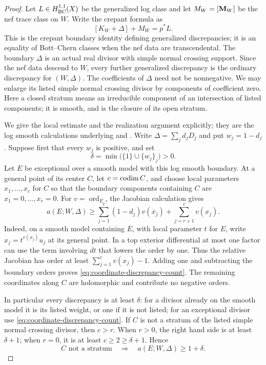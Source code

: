 \begin{proof}
Let $L\in H^{1,1}_{\mathrm{BC}}(X)$ be the generalized log class and let
$M_W=[\mathbf M_W]$ be the nef trace class on $W$.  Write the crepant formula as
\begin{equation}\label{eq:carrier-boundary-count}
 [K_W+\Delta]+M_W=p^*L.
\end{equation}
This is the crepant boundary identity defining generalized
discrepancies; it is an equality of Bott--Chern classes when the nef
data are transcendental.  The boundary $\Delta$ is an actual real
divisor with simple normal crossing support.  Since the nef data
descend to $W$, every further generalized discrepancy is the ordinary
discrepancy for $(W,\Delta)$.  The coefficients of $\Delta$ need not be
nonnegative.  We may enlarge its listed simple normal crossing divisor
by components of coefficient zero.
Here a closed stratum means an irreducible component of an intersection
of listed components; it is smooth, and is the closure of its open
stratum.

We give the local estimate and the realization argument explicitly;
they are the log smooth calculations underlying
\cite[Proposition~2.36]{KM1998} and
\cite[Proposition~2.8]{CT2023}.
Write $\Delta=\sum_j d_jD_j$ and put $w_j=1-d_j$.
Suppose first that every $w_j$ is positive, and set
\[
 \delta=\min\bigl(\{1\}\cup\{w_j\}_j\bigr)>0.
\]
Let $E$ be exceptional over a smooth model with this log smooth
boundary.  At a general point of its center $C$, let $c=\operatorname{codim} C$,
and choose local parameters $x_1,\ldots,x_c$ for $C$ so that the
boundary components containing $C$ are $x_1=0,\ldots,x_r=0$.
For $v=\operatorname{ord}_E$, the Jacobian calculation gives
\begin{equation}\label{eq:coordinate-discrepancy-count}
 a(E;W,\Delta)\geq
 \sum_{j=1}^{r}(1-d_j)v(x_j)+\sum_{j=r+1}^{c}v(x_j).
\end{equation}
Indeed, on a smooth model containing $E$, with local parameter $t$
for $E$, write $x_j=t^{v(x_j)}u_j$ at its general point.  In a top
exterior differential at most one factor can use the term involving
$dt$ that lowers the order by one.  Thus the relative Jacobian has
order at least $\sum_{j=1}^c v(x_j)-1$.  Adding one and subtracting
the boundary orders proves \eqref{eq:coordinate-discrepancy-count}.
The remaining coordinates along $C$ are holomorphic and contribute
no negative orders.

In particular every discrepancy is at least $\delta$: for a divisor
already on the smooth model it is its listed weight, or one if it is
not listed; for an exceptional divisor use
\eqref{eq:coordinate-discrepancy-count}.  If $C$ is not a stratum of
the listed simple normal crossing divisor, then $c>r$.  When $r>0$,
the right hand side is at least $\delta+1$; when $r=0$, it is at
least $c\geq 2\geq\delta+1$.  Hence
\begin{equation}\label{eq:nonstratum-cutoff}
 C\text{ not a stratum}\quad\Longrightarrow\quad
 a(E;W,\Delta)\geq 1+\delta.
\end{equation}


\end{proof}
